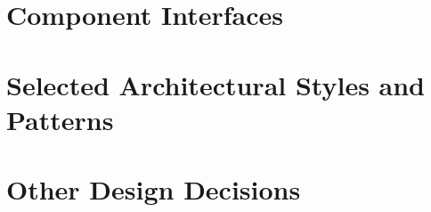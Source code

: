 \pagebreak
\begin{landscape}
\begin{center}
\thispagestyle{empty}
\end{center}
\end{landscape}
%
%
\section{Component Interfaces}
%
%
\section{Selected Architectural Styles and Patterns}
%
%
\section{Other Design Decisions}
%
%
